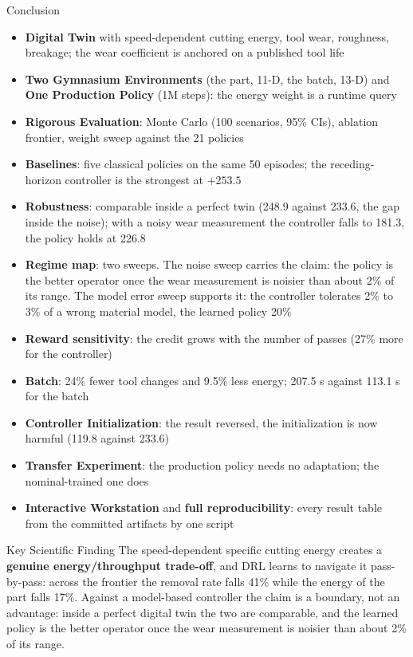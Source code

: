 \documentclass[11pt,aspectratio=169]{beamer}
\begin{document}
\begin{frame}{Conclusion}
    \scriptsize
    \setlength{\itemsep}{-3pt}
    \setlength{\topsep}{0pt}
    \setlength{\parsep}{0pt}
    \begin{itemize}
        \item \textbf{Digital Twin} with speed-dependent cutting energy, tool wear, roughness, breakage; the wear coefficient is anchored on a published tool life
        \item \textbf{Two Gymnasium Environments} (the part, 11-D, the batch, 13-D) and \textbf{One Production Policy} (1M steps): the energy weight is a runtime query
        \item \textbf{Rigorous Evaluation}: Monte Carlo (100 scenarios, 95\% CIs), ablation frontier, weight sweep against the 21 policies
        \item \textbf{Baselines}: five classical policies on the same 50 episodes; the receding-horizon controller is the strongest at $+253.5$
        \item \textbf{Robustness}: comparable inside a perfect twin (248.9 against 233.6, the gap inside the noise); with a noisy wear measurement the controller falls to 181.3, the policy holds at 226.8
        \item \textbf{Regime map}: two sweeps. The noise sweep carries the claim: the policy is the better operator once the wear measurement is noisier than \alert{about 2\% of its range}. The model error sweep supports it: the controller tolerates 2\% to 3\% of a wrong material model, the learned policy 20\%
        \item \textbf{Reward sensitivity}: the credit grows with the number of passes (27\% more for the controller)
        \item \textbf{Batch}: 24\% fewer tool changes and 9.5\% less energy; 207.5 s against 113.1 s for the batch
        \item \textbf{Controller Initialization}: the result reversed, the initialization is now harmful (119.8 against 233.6)
        \item \textbf{Transfer Experiment}: the production policy needs no adaptation; the nominal-trained one does
        \item \textbf{Interactive Workstation} and \textbf{full reproducibility}: every result table from the committed artifacts by one script
    \end{itemize}

    \vspace{-3ex}
    \begin{alertblock}{Key Scientific Finding}
    \scriptsize
    The speed-dependent specific cutting energy creates a \textbf{genuine energy/throughput trade-off}, and DRL learns to navigate it pass-by-pass: across the frontier the removal rate falls \alert{41\%} while the energy of the part falls \alert{17\%}. Against a model-based controller the claim is a \alert{boundary}, not an advantage: inside a perfect digital twin the two are comparable, and the learned policy is the better operator once the wear measurement is noisier than \alert{about 2\% of its range}.
    \end{alertblock}
\end{frame}
\end{document}
